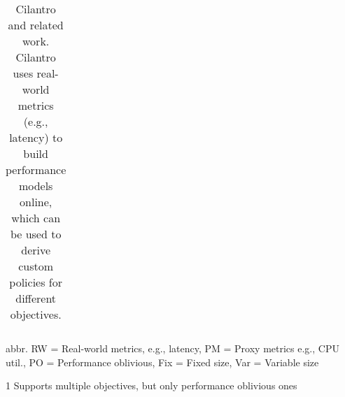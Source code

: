 {\begin{table*}[ht]
\begin{threeparttable}
\begin{tabular}{p{1 cm}ccccccccccccc}
\end{tabular}
\begin{tablenotes}[flushleft]\tiny
\item abbr. RW = Real-world metrics, e.g., latency, PM = Proxy metrics e.g., CPU util., PO = Performance oblivious, Fix = Fixed size, Var = Variable size
\item [1] Supports multiple objectives, but only performance oblivious ones
\end{tablenotes}
\caption{Cilantro and related work. Cilantro uses real-world metrics (e.g., latency) to build performance models online, which can be used to derive custom policies for different objectives.}
\vspace{-1em}
\label{tab:relatedwork}
\end{threeparttable}
\end{table*}
}
